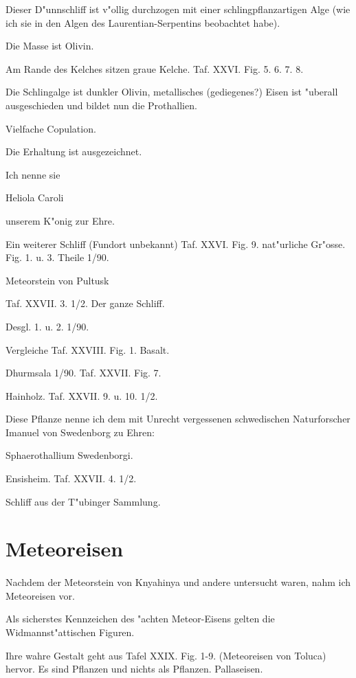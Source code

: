 \documentclass[a4paper, 11pt, oneside, german]{article}
\begin{document}
Dieser D"unnschliff ist v"ollig durchzogen mit einer schlingpflanzartigen Alge (wie ich sie in den Algen des Laurentian-Serpentins beobachtet habe).

Die Masse ist Olivin.

Am Rande des Kelches sitzen graue Kelche. Taf. XXVI. Fig. 5. 6. 7. 8.

Die Schlingalge ist dunkler Olivin, metallisches (gediegenes?) Eisen ist "uberall ausgeschieden und bildet nun die Prothallien.

Vielfache Copulation.

Die Erhaltung ist ausgezeichnet.

Ich nenne sie

Heliola Caroli

unserem K"onig zur Ehre.

    Ein weiterer Schliff (Fundort unbekannt) Taf. XXVI. Fig. 9. nat"urliche Gr"osse. Fig. 1. u. 3. Theile 1/90.

    Meteorstein von Pultusk

Taf. XXVII. 3. 1/2. Der ganze Schliff.

    Desgl. 1. u. 2. 1/90.

Vergleiche Taf. XXVIII. Fig. 1. Basalt.

    Dhurmsala 1/90. Taf. XXVII. Fig. 7.

    Hainholz. Taf. XXVII. 9. u. 10. 1/2.

Diese Pflanze nenne ich dem mit Unrecht vergessenen schwedischen Naturforscher Imanuel von Swedenborg zu Ehren:

Sphaerothallium Swedenborgi.

    Ensisheim. Taf. XXVII. 4. 1/2.

    Schliff aus der T"ubinger Sammlung.
\clearpage
\section{Meteoreisen}
\paragraph{}
Nachdem der Meteorstein von Knyahinya und andere untersucht waren, nahm ich Meteoreisen vor.

Als sicherstes Kennzeichen des "achten Meteor-Eisens gelten die Widmannst"attischen Figuren.

Ihre wahre Gestalt geht aus Tafel XXIX. Fig. 1-9. (Meteoreisen von Toluca) hervor. Es sind Pflanzen und nichts als Pflanzen.
Pallaseisen.
\end{document}
